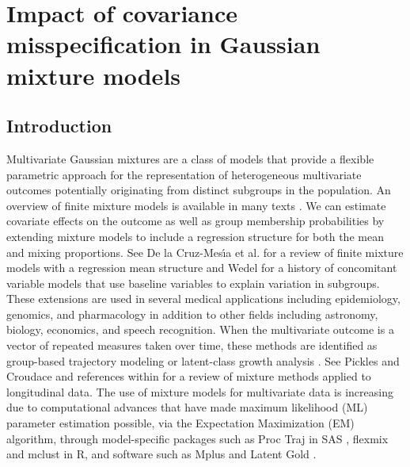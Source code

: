 \chapter{Impact of covariance misspecification in Gaussian mixture models}
\section{Introduction}
Multivariate Gaussian mixtures are a class of models that provide a flexible parametric approach for the representation of heterogeneous multivariate outcomes potentially originating from distinct subgroups in the population. An overview of finite mixture models is available in many texts \cite{everitt1981,titterington1985,mclachlan1988,mclachlan2000,fruhwirth2006}. We can estimate covariate effects on the outcome as well as group membership probabilities by extending mixture models to include a regression structure for both the mean and mixing proportions. See De la Cruz-Mes\'{\i}a et al. \cite{cruzmesia2008} for a review of finite mixture models with a regression mean structure and Wedel \cite{wedel2002} for a history of concomitant variable models that use baseline variables to explain variation in subgroups. These extensions are used in several medical applications  \cite{pranab2011} including epidemiology, genomics, and pharmacology in addition to other fields including astronomy, biology, economics, and speech recognition. When the multivariate outcome is a vector of repeated measures taken over time, these methods are identified as group-based trajectory modeling \cite{nagin1999,nagin2005} or latent-class growth analysis \cite{muthen2000, muthen2001}. See Pickles and Croudace \cite{pickles2010} and references within for a review of mixture methods applied to longitudinal data. The use of mixture models for multivariate data is increasing due to computational advances that have made maximum likelihood (ML) parameter estimation possible, via the Expectation Maximization (EM) algorithm, through model-specific packages such as Proc Traj in SAS \cite{jones2001}, flexmix  \cite{leisch2004} and mclust \cite{fraley1999} in R, and software such as Mplus \cite{muthen2010} and Latent Gold \cite{vermunt2005}.

